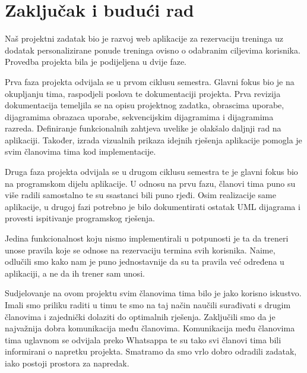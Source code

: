\chapter{Zaključak i budući rad}
		 
		 {Naš projektni zadatak bio je razvoj web aplikacije za rezervaciju treninga uz dodatak personalizirane ponude treninga ovisno o odabranim ciljevima korisnika. Provedba projekta bila je podijeljena u dvije faze. }
		 
		 {Prva faza projekta odvijala se u prvom ciklusu semestra. Glavni fokus bio je na okupljanju tima, raspodjeli poslova te dokumentaciji projekta. Prva revizija dokumentacija temeljila se na opisu projektnog zadatka, obrascima uporabe, dijagramima obrazaca uporabe, sekvencijskim dijagramima i dijagramima razreda. Definiranje funkcionalnih zahtjeva uvelike je olakšalo daljnji rad na aplikaciji. Također, izrada vizualnih prikaza idejnih rješenja aplikacije pomogla je svim članovima tima kod implementacije. }
		 
		 {Druga faza projekta odvijala se u drugom ciklusu semestra te je glavni fokus bio na programskom dijelu aplikacije. U odnosu na prvu fazu, članovi tima puno su više radili samostalno te su ssastanci bili puno rjeđi. Osim realizacije same aplikacije, u drugoj fazi potrebno je bilo dokumentirati ostatak UML dijagrama i provesti ispitivanje programskog rješenja. }
		 
		 {Jedina funkcionalnost koju nismo implementirali u potpunosti je ta da treneri unose pravila koje se odnose na rezervaciju termina svih korisnika. Naime, odlučili smo kako nam je puno jednostavnije da su ta pravila već određena u aplikaciji, a ne da ih trener sam unosi.}
		 
		 {Sudjelovanje na ovom projektu svim članovima tima bilo je jako korisno iskustvo. Imali smo priliku raditi u timu te smo na taj način naučili surađivati s drugim članovima i zajednički dolaziti do optimalnih rješenja. Zaključili smo da je najvažnija dobra komunikacija među članovima. Komunikacija među članovima tima uglavnom se odvijala preko Whatsappa te su tako svi članovi tima bili informirani o napretku projekta. Smatramo da smo vrlo dobro odradili zadatak, iako postoji prostora za napredak. }
		
		\eject 